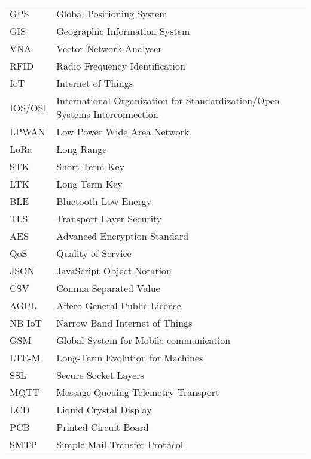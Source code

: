 
\seznamzkr

\begin{tabular}{ll}
GPS & Global Positioning System \\
GIS & Geographic Information System \\
VNA & Vector Network Analyser \\
RFID & Radio Frequency Identification \\
IoT & Internet of Things \\
IOS/OSI & International Organization for Standardization/Open Systems Interconnection \\
LPWAN & Low Power Wide Area Network \\
LoRa & Long Range \\
STK & Short Term Key \\
LTK & Long Term Key \\
BLE & Bluetooth Low Energy \\
TLS & Transport Layer Security \\
AES & Advanced Encryption Standard \\
QoS & Quality of Service \\
JSON & JavaScript Object Notation \\
CSV & Comma Separated Value \\
AGPL & Affero General Public License \\
NB IoT & Narrow Band Internet of Things \\
GSM & Global System for Mobile communication \\
LTE-M & Long-Term Evolution for Machines \\
SSL & Secure Socket Layers \\
MQTT & Message Queuing Telemetry Transport \\
LCD & Liquid Crystal Display \\
PCB & Printed Circuit Board \\
SMTP & Simple Mail Transfer Protocol \\
\end{tabular}

